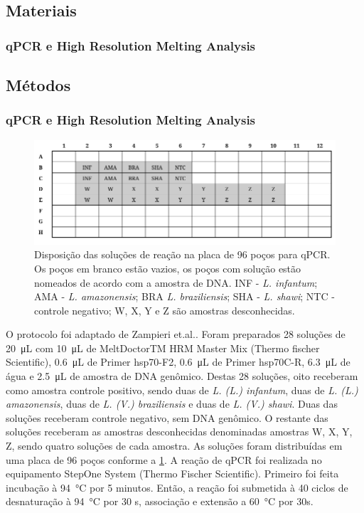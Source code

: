 \subsection{Materiais}
\subsubsection{qPCR e High Resolution Melting Analysis}
     
\subsection{Métodos}
\subsubsection{qPCR e High Resolution Melting Analysis}

\begin{figure}
    \centering
    \includegraphics[width=.4\textwidth]{fig/placa_org.png}
    \caption{Disposição das soluções de reação na placa de 96 poços para qPCR. Os poços em branco estão vazios, os poços com solução estão nomeados de acordo com a amostra de DNA. INF - \textit{L. infantum}; AMA - \textit{L. amazonensis}; BRA \textit{L. braziliensis}; SHA - \textit{L. shawi}; NTC - controle negativo; W, X, Y e Z são amostras desconhecidas.}
    \label{wellorg}
\end{figure}

O protocolo foi adaptado de Zampieri et.al.\cite{HRMzampi2016}.
Foram preparados 28 soluções de \qty{20}{\micro\liter} com
\qty{10}{\micro\liter} de
MeltDoctorTM HRM Master Mix (Thermo fischer Scientific), \qty{0,6}{\micro\liter} de
Primer hsp70-F2, \qty{0,6}{\micro\liter} de Primer hsp70C-R,
\qty{6,3}{\micro\liter} de
água e \qty{2,5}{\micro\liter} de amostra de DNA genômico. Destas 28 soluções,
oito receberam como amostra controle positivo, sendo duas de \textit{L. (L.)
infantum}, duas de \textit{L. (L.) amazonensis}, duas de \textit{L. (V.)
braziliensis} e duas de \textit{L. (V.) shawi}. Duas das soluções receberam
controle negativo, sem DNA genômico. O restante das soluções receberam as
amostras desconhecidas denominadas amostras W, X, Y, Z, sendo quatro soluções de
cada amostra. As soluções foram distribuídas em uma placa de 96 poços conforme a
\cref{wellorg}. A reação de qPCR foi realizada no equipamento StepOne System
(Thermo Fischer Scientific). Primeiro foi feita incubação à \qty{94}{\celsius}
por 5 minutos.  Então, a reação foi submetida à 40 ciclos de desnaturação à
\qty{94}{\celsius} por 30 s, associação e extensão a \qty{60}{\celsius} por 30s. 


